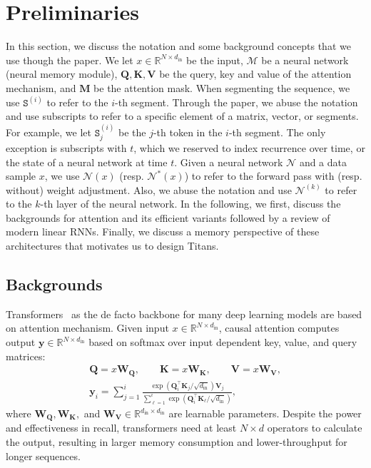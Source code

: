 \documentclass{article}
\newcommand{\citep}{\parencite}
\newcommand{\R}[0]{\mathbb{R}}
\newcommand{\M}[0]{\mathcal{M}}
\newcommand{\head}[1]{\vspace{1.7mm}\noindent{{\textcolor{c3}{\bf #1.}}}}
\begin{document}
\section{Preliminaries}\label{sec:prelim}
\lettrine[lines=3]{I}{}n this section, we discuss the notation and some background concepts that we use though the paper. We let $x \in \mathbb{R}^{N \times d_{\text{in}}}$ be the input, $\M$ be a neural network (neural memory module), $\mathbf{Q}, \mathbf{K}, \mathbf{V}$ be the query, key and value of the attention mechanism, and $\mathbf{M}$ be the attention mask. When segmenting the sequence, we use $\texttt{S}^{(i)}$ to refer to the $i$-th segment. Through the paper, we abuse the notation and use subscripts to refer to a specific element of a matrix, vector, or segments. For example, we let $\texttt{S}^{(i)}_j$ be the $j$-th token in the $i$-th segment. The only exception is subscripts with $t$, which we reserved to index recurrence over time, or the state of a neural network at time $t$. Given a neural network $\mathcal{N}$ and a data sample $x$, we use $\mathcal{N}(x)$ (resp. $\mathcal{N}^*(x)$) to refer to the forward pass with (resp. without) weight adjustment. Also, we abuse the notation and use $\mathcal{N}^{(k)}$ to refer to the $k$-th layer of the neural network. In the following, we first, discuss the backgrounds for attention and its efficient variants followed by a review of modern linear RNNs. Finally, we discuss a memory perspective of these architectures that motivates us to design Titans. 

\subsection{Backgrounds}\label{sec:background}
\head{Attention}
Transformers~\citep{transformers} as the de facto backbone for many deep learning models are based on attention mechanism. Given input $x \in \R^{N \times d_{\text{in}}}$, causal attention computes output $\mathbf{y} \in \R^{N \times d_{\text{in}}}$ based on softmax over input dependent key, value, and query matrices:
\begin{align}
    \mathbf{Q} = x \mathbf{W}_{\mathbf{Q}}, \qquad \mathbf{K} = x \mathbf{W}_{\mathbf{K}}, \qquad \mathbf{V} = x \mathbf{W}_{\mathbf{V}}, \\
    \mathbf{y}_i = \sum_{j = 1}^{i} \frac{ \exp\left( \mathbf{Q}_i^{\top} \mathbf{K}_j/\sqrt{d_{\text{in}}}\right) \mathbf{V}_j }{\sum_{\ell = 1}^{i} \exp\left( \mathbf{Q}_i^{\top} \mathbf{K}_{\ell}/\sqrt{d_{\text{in}}}\right)},
\end{align}
where $\mathbf{W}_{\mathbf{Q}}, \mathbf{W}_{\mathbf{K}},$ and $\mathbf{W}_{\mathbf{V}} \in \R^{d_{\text{in}} \times d_{\text{in}}}$ are learnable parameters. Despite the power and effectiveness in recall, transformers need at least $N\times d$ operators to calculate the output, resulting in larger memory consumption and lower-throughput for longer sequences.  
\end{document}
